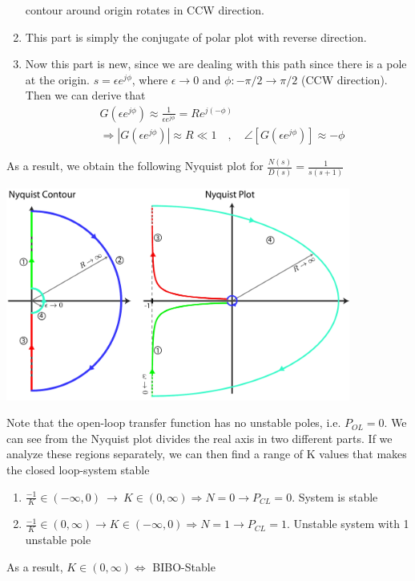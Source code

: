 \documentclass[twoside]{article}
\begin{document}
\begin{enumerate}
   contour around origin rotates in CCW direction. 
   \item This part is simply the conjugate of polar plot with reverse
     direction. 
  \item Now this part is new, since we are dealing with this path
    since there is a pole at the origin. 
     $s = \epsilon e^{j \phi}$, where $\epsilon \to 0$ and $\phi :
     -\pi/2 \to \pi/2$ (CCW direction).  Then  we can derive that  
   \begin{align*}
     & G \left( \epsilon e^{j \phi} \right) \approx \frac{1}{\epsilon e^{j
        \phi}} = R e^{j (-\phi)}
       \\
    &\Rightarrow | G \left(\epsilon e^{j \phi} \right) | \approx
     R \ll 1
   \quad , \quad \angle [ G \left( \epsilon e^{j \phi} \right) ] \approx -\phi
   \end{align*}
\end{enumerate}

As a result, we obtain the following Nyquist plot for
$\frac{N(s)}{D(s)} = \frac{1}{s (s+1)}$

\vspace{6 pt}

  \begin{minipage}[h]{1\linewidth}
    \begin{center}
      \includegraphics[width=0.85\textwidth]{ex5}
    \end{center}
  \end{minipage}

\vspace{6 pt}

Note that the open-loop transfer function has no unstable poles,
i.e. $P_{OL} = 0$. 
We can see from the Nyquist plot divides the real axis in
two different parts. If we analyze  these regions separately, we can 
then find a range of K values that makes the closed loop-system stable
%
\begin{enumerate}
  \item $\frac{-1}{K} \in (-\infty , 0) \ \rightarrow \ K \in (0 , \infty) 
    \Rightarrow N = 0 \rightarrow P_{CL} = 0 $. System is stable 
  \item $\frac{-1}{K} \in (0, \infty) \rightarrow K \in (-\infty , 0)    
    \Rightarrow N = 1 \rightarrow P_{CL} = 1 $. Unstable system with 1
    unstable pole
\end{enumerate}
%
As a result, $K \in (0 , \infty) \Leftrightarrow $ BIBO-Stable
\end{document}
